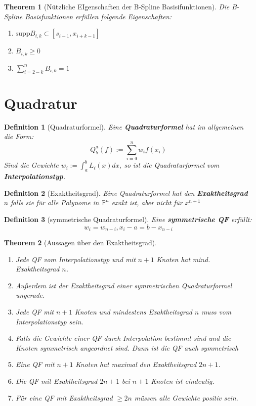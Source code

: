 \documentclass[10pt,a4paper]{article}
\newtheorem{theorem}{Theorem}
\newtheorem{definition}{Definition}
\begin{document}
	\begin{theorem}[Nützliche EIgenschaften der B-Spline Basisifunktionen]
		Die B-Spline Basisfunktionen erfüllen folgende Eigenschaften:
		\begin{enumerate}
			\item $\text{supp} B_{i, k} \subset [s_{i-1}, x_{i+k-1}]$
			\item $B_{i, k} \geq 0$
			\item $\sum_{i=2-k}^n B_{i, k} = 1$
		\end{enumerate}
	\end{theorem}
	\section{Quadratur}
	\begin{definition}[Quadraturformel]
		Eine \textbf{Quadraturformel} hat im allgemeinen die Form:
		$$Q^a_b(f) := \sum_{i=0}^{n}w_if(x_i)$$
		Sind die Gewichte $w_i := \int_a^bL_i(x)dx$, so ist die Quadraturformel vom \textbf{Interpolationstyp}.
	\end{definition}
	\begin{definition}[Exaktheitsgrad]
		Eine Quadraturformel hat den \textbf{Exaktheitsgrad} $n$ falls sie für alle Polynome in $\mathbb{P}^n$ exakt ist, aber nicht für $x^{n+1}$
	\end{definition}
	\begin{definition}[symmetrische Quadraturformel]
		Eine \textbf{symmetrische QF} erfüllt:
		$$w_i = w_{n-i}, x_i-a=b-x_{n-i}$$
	\end{definition}
	\begin{theorem}[Aussagen über den Exaktheitsgrad]
		\begin{enumerate}
			\item Jede QF vom Interpolationstyp und mit $n+1$ Knoten hat mind. Exaktheitsgrad $n$. 
			\item Außerdem ist der Exaktheitsgrad einer symmetrischen Quadraturformel ungerade.
			\item Jede QF mit $n+1$ Knoten und mindestens Exaktheitsgrad $n$ muss vom Interpolationstyp sein.
			\item Falls die Gewichte einer QF durch Interpolation bestimmt sind und die Knoten symmetrisch angeordnet sind. Dann ist die QF auch symmetrisch
			\item Eine QF mit $n+1$ Knoten hat maximal den Exaktheitsgrad $2n+1$.
			\item Die QF mit Exaktheitsgrad $2n+1$ bei $n+1$ Knoten ist eindeutig.
			\item Für eine QF mit Exaktheitsgrad $\geq 2n$ müssen alle Gewichte positiv sein.
		\end{enumerate}
	\end{theorem}
\end{document}
